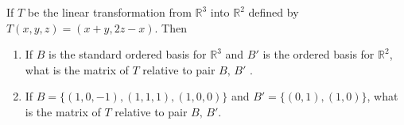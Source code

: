 \documentclass[11pt]{article}
\newcommand{\R}{\mathbb{R}}
\begin{document}
\begin{questions}
If $T$ be the linear transformation from $\R^3$ into $\R^2$ defined by $T(x,y,z)=(x+y, 2z-x)$. Then
\begin{enumerate}
\item If $B$ is the standard ordered basis for $\R^3$ and $B'$ is the ordered basis for $\R^2$, what is the matrix of $T$ relative to pair $B,\,B'$ .
\item If $B = \{(1,0,-1),(1,1,1),(1,0,0)\}$  and $B'=\{(0,1),(1,0)\}$, what is the matrix of $T$ relative to pair $B,\,B'$.	
\end{enumerate}
\end{questions}
\end{document}
